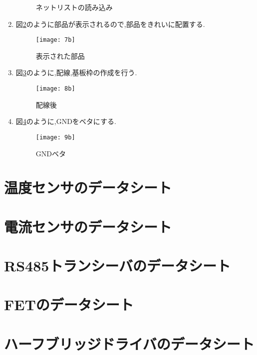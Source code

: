 \begin{enumerate}
\begin{figure}[H]
\begin{center}
    \end{center}
  \caption{ネットリストの読み込み}
 \label{fig:6j}
\end{figure}
\item 図\ref{fig:7b}のように部品が表示されるので,部品をきれいに配置する.
\begin{figure}[H]
  \begin{center}
    \texttt{[image: 7b]}
    \end{center}
  \caption{表示された部品}
 \label{fig:7b}
\end{figure}
\item 図\ref{fig:8b}のように,配線,基板枠の作成を行う.
\begin{figure}[H]
  \begin{center}
    \texttt{[image: 8b]}
    \end{center}
  \caption{配線後}
 \label{fig:8b}
\end{figure}
\item 図\ref{fig:9b}のように,GNDをベタにする.
\begin{figure}[H]
  \begin{center}
    \texttt{[image: 9b]}
    \end{center}
  \caption{GNDベタ}
 \label{fig:9b}
\end{figure}
\end{enumerate}

\chapter{温度センサのデータシート}

\chapter{電流センサのデータシート}

\chapter{RS485トランシーバのデータシート}

\chapter{FETのデータシート}

\chapter{ハーフブリッジドライバのデータシート}

